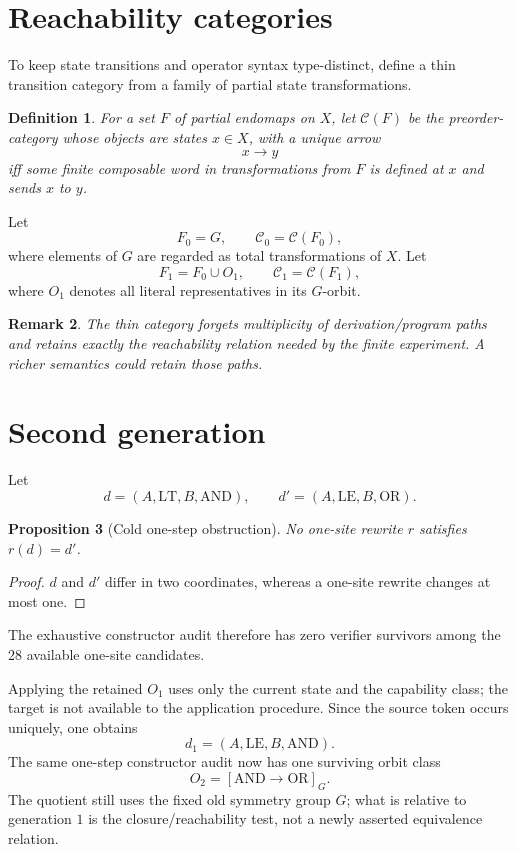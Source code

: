 \documentclass[11pt]{article}
\newtheorem{definition}{Definition}[section]
\newtheorem{proposition}[definition]{Proposition}
\newtheorem{remark}[definition]{Remark}
\begin{document}
\section{Reachability categories}

To keep state transitions and operator syntax type-distinct, define a thin transition category
from a family of partial state transformations.

\begin{definition}
For a set $F$ of partial endomaps on $X$, let $\mathcal C(F)$ be the preorder-category whose
objects are states $x\in X$, with a unique arrow
\[
x\longrightarrow y
\]
iff some finite composable word in transformations from $F$ is defined at $x$ and sends $x$ to $y$.
\end{definition}

Let
\[
F_0=G,
\qquad
\mathcal C_0=\mathcal C(F_0),
\]
where elements of $G$ are regarded as total transformations of $X$. Let
\[
F_1=F_0\cup O_1,
\qquad
\mathcal C_1=\mathcal C(F_1),
\]
where $O_1$ denotes all literal representatives in its $G$-orbit.

\begin{remark}
The thin category forgets multiplicity of derivation/program paths and retains exactly the
reachability relation needed by the finite experiment. A richer semantics could retain those paths.
\end{remark}

\section{Second generation}

Let
\[
d=(A,\mathrm{LT},B,\mathrm{AND}),\qquad
 d'=(A,\mathrm{LE},B,\mathrm{OR}).
\]

\begin{proposition}[Cold one-step obstruction]
No one-site rewrite $r$ satisfies $r(d)=d'$.
\end{proposition}

\begin{proof}
$d$ and $d'$ differ in two coordinates, whereas a one-site rewrite changes at most one.
\end{proof}

The exhaustive constructor audit therefore has zero verifier survivors among the $28$ available
one-site candidates.

Applying the retained $O_1$ uses only the current state and the capability class; the target is
not available to the application procedure. Since the source token occurs uniquely, one obtains
\[
d_1=(A,\mathrm{LE},B,\mathrm{AND}).
\]
The same one-step constructor audit now has one surviving orbit class
\[
O_2=[\mathrm{AND}\to\mathrm{OR}]_G.
\]
The quotient still uses the fixed old symmetry group $G$; what is relative to generation $1$ is
the closure/reachability test, not a newly asserted equivalence relation.
\end{document}
